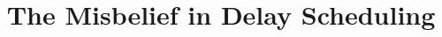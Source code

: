 \documentclass[10pt,conference,compsocconf,letterpaper]{IEEEtran}
\begin{document}


\title{The Misbelief in Delay Scheduling}

\date{}
\maketitle



\begin{abstract}
%

\end{abstract}















%
{}
%
 
\end{document}
